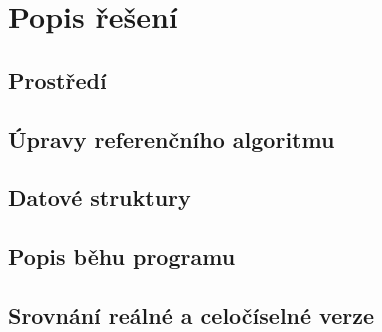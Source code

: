 \chapter{Popis řešení}

\section{Prostředí}

\section{Úpravy referenčního algoritmu}

\section{Datové struktury}

\section{Popis běhu programu}

\section{Srovnání reálné a celočíselné verze} \label{int_v_real}

